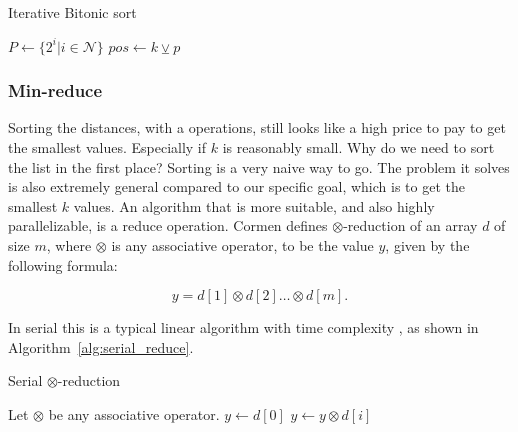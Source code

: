 \begin{algorithm}[ht]
\caption{Iterative Bitonic sort}
\label{alg:bitonic_sort}
\begin{algorithmic}
    \State $P \gets \{2^i|i \in \mathcal{N} \}$
                \State $pos \gets k \veebar p$ 
                     
                        \State {}
                    \EndIf
                        \State {}
                    \EndIf
                \EndIf
                \EndFor
            \EndFor
        \EndFor
    \EndFunction
    \Statex
    \State {}
    \EndIf
    \EndFunction
\end{algorithmic}
\end{algorithm}

\subsubsection{Min-reduce} %
\label{ssub:min_reduce}

Sorting the distances, with a  operations, still looks like a high price to pay to get the smallest values. Especially if $k$ is reasonably small. Why do we need to sort the list in the first place? Sorting is a very naive way to go. The problem it solves is also extremely general compared to our specific goal, which is to get the smallest $k$ values. An algorithm that is more suitable, and also highly parallelizable, is a reduce operation. Cormen\cite{Cormen:2001} defines $\otimes$-reduction of an array $d$ of size $m$, where $\otimes$ is any associative operator, to be the value $y$, given by the following formula:

     $$ y = d[1] \otimes d[2] \dots \otimes d[m].$$

In serial this is a typical linear algorithm with time complexity , as shown in Algorithm~\ref{alg:serial_reduce}. 

\begin{algorithm}[ht]
\caption{Serial $\otimes$-reduction}
\label{alg:serial_reduce}
\begin{algorithmic}
    \State Let $\otimes$ be any associative operator.
        \State $y \gets d[0]$
            \State $y \gets y \otimes d[i]$
        \EndFor
    \EndFunction
\end{algorithmic}
\end{algorithm}

